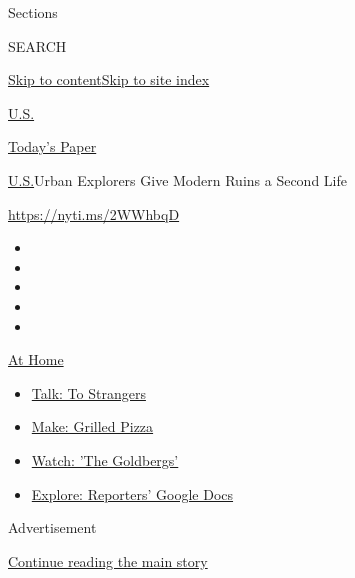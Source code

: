 Sections

SEARCH

\protect\hyperlink{site-content}{Skip to
content}\protect\hyperlink{site-index}{Skip to site index}

\href{https://www.nytimes.com/section/us}{U.S.}

\href{https://myaccount.nytimes.com/auth/login?response_type=cookie\&client_id=vi}{}

\href{https://www.nytimes.com/section/todayspaper}{Today's Paper}

\href{/section/us}{U.S.}\textbar{}Urban Explorers Give Modern Ruins a
Second Life

\url{https://nyti.ms/2WWhbqD}

\begin{itemize}
\item
\item
\item
\item
\item
\end{itemize}

\href{https://www.nytimes.com/spotlight/at-home?action=click\&pgtype=Article\&state=default\&region=TOP_BANNER\&context=at_home_menu}{At
Home}

\begin{itemize}
\tightlist
\item
  \href{https://www.nytimes.com/2020/08/03/well/family/the-benefits-of-talking-to-strangers.html?action=click\&pgtype=Article\&state=default\&region=TOP_BANNER\&context=at_home_menu}{Talk:
  To Strangers}
\item
  \href{https://www.nytimes.com/2020/08/01/at-home/coronavirus-make-pizza-on-a-grill.html?action=click\&pgtype=Article\&state=default\&region=TOP_BANNER\&context=at_home_menu}{Make:
  Grilled Pizza}
\item
  \href{https://www.nytimes.com/2020/07/31/arts/television/goldbergs-abc-stream.html?action=click\&pgtype=Article\&state=default\&region=TOP_BANNER\&context=at_home_menu}{Watch:
  'The Goldbergs'}
\item
  \href{https://www.nytimes.com/interactive/2020/at-home/even-more-reporters-editors-diaries-lists-recommendations.html?action=click\&pgtype=Article\&state=default\&region=TOP_BANNER\&context=at_home_menu}{Explore:
  Reporters' Google Docs}
\end{itemize}

Advertisement

\protect\hyperlink{after-top}{Continue reading the main story}

